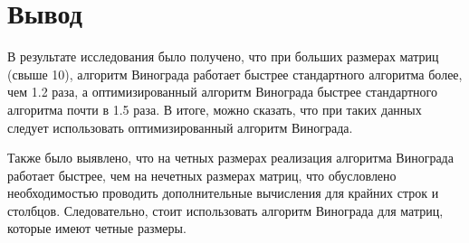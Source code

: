 \clearpage

\section{Вывод}

В результате исследования было получено, что при больших размерах матриц (свыше 10), алгоритм Винограда работает быстрее стандартного алгоритма более, чем 1.2 раза, а оптимизированный алгоритм Винограда быстрее стандартного алгоритма почти в 1.5 раза. В итоге, можно сказать, что при таких данных следует использовать оптимизированный алгоритм Винограда.

Также было выявлено, что на четных размерах реализация алгоритма Винограда работает быстрее, чем на нечетных размерах матриц, что обусловлено необходимостью проводить дополнительные вычисления для крайних строк и столбцов. Следовательно, стоит использовать алгоритм Винограда для матриц, которые имеют четные размеры.